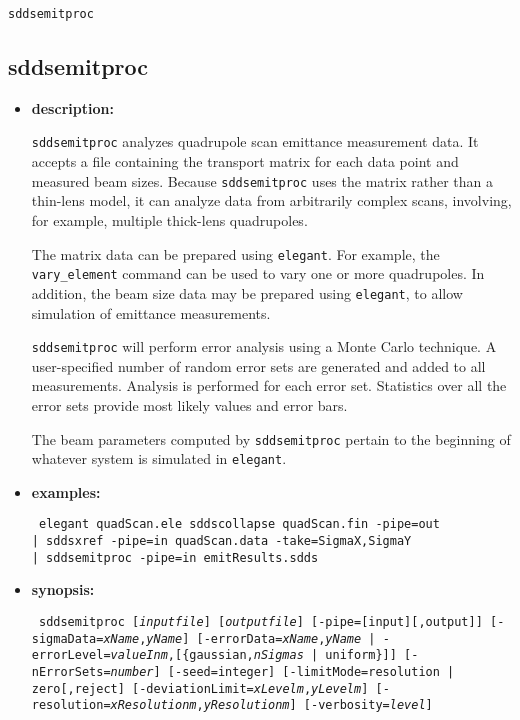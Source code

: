 \documentclass[11pt]{article}
\begin{document}
\newpage
\begin{center}{\Large\verb|sddsemitproc|}\end{center}
\subsection{sddsemitproc}
\label{sddsemitproc}

\begin{itemize}

\item {\bf description:} 

{\tt sddsemitproc} analyzes quadrupole scan emittance measurement
data.  It accepts a file containing the transport matrix for each data
point and measured beam sizes.  Because {\tt sddsemitproc} uses the
matrix rather than a thin-lens model, it can analyze data from
arbitrarily complex scans, involving, for example, multiple thick-lens
quadrupoles.

The matrix data can be prepared using {\tt elegant}.  For example, the
{\tt vary\_element} command can be used to vary one or more
quadrupoles.  In addition, the beam size data may be prepared using
{\tt elegant}, to allow simulation of emittance measurements.

{\tt sddsemitproc} will perform error analysis using a Monte Carlo
technique.  A user-specified number of random error sets are generated
and added to all measurements.  Analysis is performed for each error
set.  Statistics over all the error sets provide most likely values
and error bars.

The beam parameters computed by {\tt sddsemitproc} pertain to the
beginning of whatever system is simulated in {\tt elegant}.

\item {\bf examples:}
\begin{flushleft}{\tt
elegant quadScan.ele
sddscollapse quadScan.fin -pipe=out \\
| sddsxref -pipe=in quadScan.data -take=SigmaX,SigmaY \\
| sddsemitproc -pipe=in emitResults.sdds
}\end{flushleft}

\item {\bf synopsis:}
\begin{flushleft}{\tt
sddsemitproc [{\em inputfile}] [{\em outputfile}] [-pipe=[input][,output]]
 [-sigmaData={\em xName},{\em yName}]
 [-errorData={\em xName},{\em yName} | 
  -errorLevel={\em valueInm},[\{gaussian,{\em nSigmas} | uniform\}]]
 [-nErrorSets={\em number}] [-seed=integer]
 [-limitMode={resolution | zero}[{,reject}]
 [-deviationLimit={\em xLevelm},{\em yLevelm}]
 [-resolution={\em xResolutionm},{\em yResolutionm}]
 [-verbosity={\em level}]
}\end{flushleft}


\end{itemize}
\end{document}
